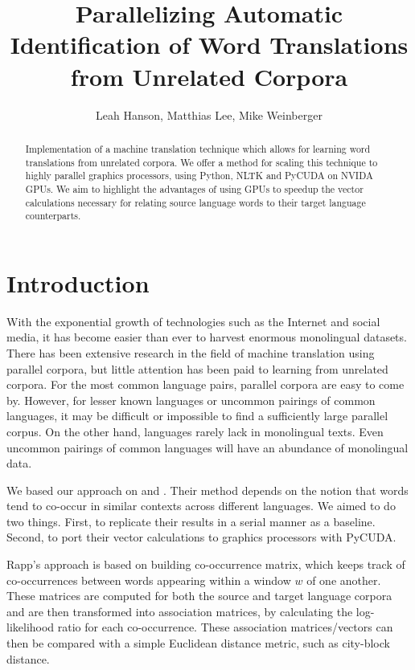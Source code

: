 \documentclass[12pt]{article}
\title{Parallelizing Automatic Identification of Word Translations from Unrelated Corpora}
\author{Leah Hanson, Matthias Lee, Mike Weinberger}
\begin{document}
\maketitle
\begin{abstract}

Implementation of a machine translation technique which allows for learning word translations from unrelated corpora. We offer a method for scaling this technique to highly parallel graphics processors, using Python, NLTK and PyCUDA on NVIDA GPUs. We aim to highlight the advantages of using GPUs to speedup the vector calculations necessary for relating source language words to their target language counterparts.

\end{abstract}
\section{Introduction}

With the exponential growth of technologies such as the Internet and social media, it has become easier than ever to harvest enormous monolingual datasets. There has been extensive research in the field of machine translation using parallel corpora, but little attention has been paid to learning from unrelated corpora. For the most common language pairs, parallel corpora are easy to come by. However, for lesser known languages or uncommon pairings of common languages, it may be difficult or impossible to find a sufficiently large parallel corpus. On the other hand, languages rarely lack in monolingual texts. Even uncommon pairings of common languages will have an abundance of monolingual data.


We based our approach on \cite{rapp1999automatic} and \cite{rapp1995identifying}. Their method depends on the notion that words tend to co-occur in similar contexts across different languages. We aimed to do two things. First, to replicate their results in a serial manner as a baseline. Second, to port their vector calculations to graphics processors with PyCUDA.

Rapp's approach is based on building co-occurrence matrix, which keeps track of co-occurrences between words appearing within a window $w$ of one another. These matrices are computed for both the source and target language corpora and are then transformed into association matrices, by calculating the log-likelihood ratio for each co-occurrence. These association matrices/vectors can then be compared with a simple Euclidean distance metric, such as city-block distance.
\end{document}
